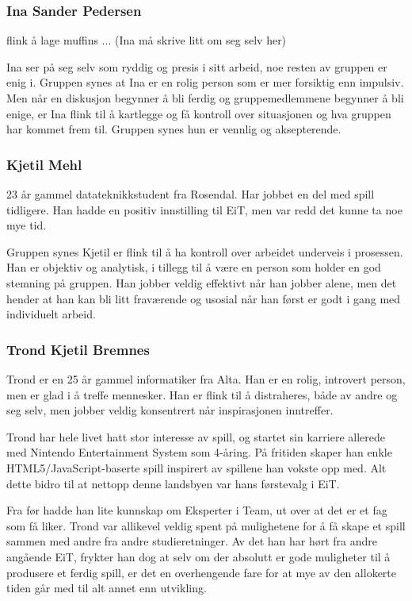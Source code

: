	\subsubsection{Ina Sander Pedersen}
	flink å lage muffins ... (Ina må skrive litt om seg selv her)

	Ina ser på seg selv som ryddig og presis i sitt arbeid, noe resten av gruppen er enig i. Gruppen synes at Ina er en rolig person som er mer forsiktig enn impulsiv. Men når en diskusjon begynner å bli ferdig og gruppemedlemmene begynner å bli enige, er Ina flink til å kartlegge og få kontroll over situasjonen og hva gruppen har kommet frem til. Gruppen synes hun er vennlig og aksepterende.

	\subsubsection{Kjetil Mehl}
	23 år gammel datateknikkstudent fra Rosendal. Har jobbet en del med spill tidligere. Han hadde en positiv innstilling til EiT, men var redd det kunne ta noe mye tid.

	Gruppen synes Kjetil er flink til å ha kontroll over arbeidet underveis i prosessen. Han er objektiv og analytisk, i tillegg til å være en person som holder en god stemning på gruppen. Han jobber veldig effektivt når han jobber alene, men det hender at han kan bli litt fraværende og usosial når han først er godt i gang med individuelt arbeid.


	\subsubsection{Trond Kjetil Bremnes}
	Trond er en 25 år gammel informatiker fra Alta. Han er en rolig, introvert person, men er glad i å treffe mennesker. Han er flink til å distraheres, både av andre og seg selv, men jobber veldig konsentrert når inspirasjonen inntreffer.

	Trond har hele livet hatt stor interesse av spill, og startet sin karriere allerede med Nintendo Entertainment System som 4-åring. På fritiden skaper han enkle HTML5/JavaScript-baserte spill inspirert av spillene han vokste opp med. Alt dette bidro til at nettopp denne landsbyen var hans førstevalg i EiT.

	Fra før hadde han lite kunnskap om Eksperter i Team, ut over at det er et fag som få liker. Trond var allikevel veldig spent på mulighetene for å få skape et spill sammen med andre fra andre studieretninger. Av det han har hørt fra andre angående EiT, frykter han dog at selv om der absolutt er gode muligheter til å produsere et ferdig spill, er det en overhengende fare for at mye av den allokerte tiden går med til alt annet enn utvikling.


